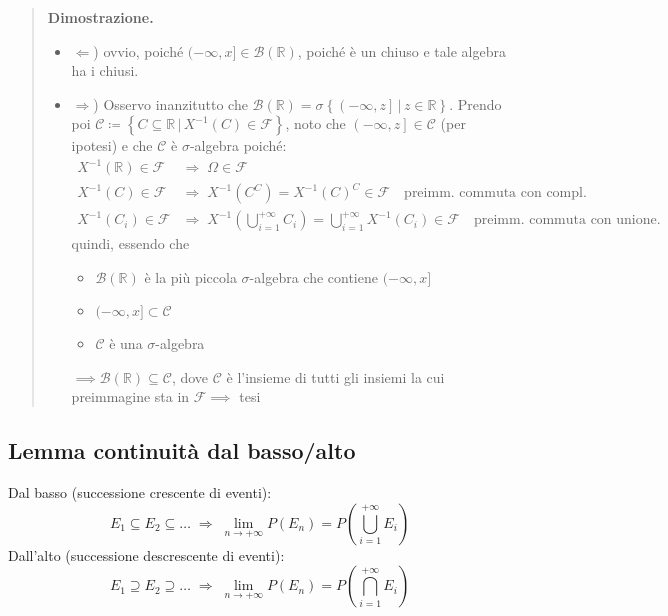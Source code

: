 \documentclass[a4paper,10pt]{article}
\newcommand{\re}{\mathbb{R}} %
\theoremstyle{remark}
\theoremstyle{definition}
\newenvironment{dimo}{\begin{quote}\textbf{Dimostrazione.}}{\end{quote}} %
\begin{document}
\begin{dimo}
\begin{itemize}
\item $\Leftarrow$) ovvio, poiché $(-\infty,x]\in\mathcal{B}(\re)$, poiché è un chiuso e tale algebra ha i chiusi.
\item $\Rightarrow$) Osservo inanzitutto che $\mathcal{B}\left(\mathbb{R}\right)=\sigma\left\{ \left(-\infty,z\right]\,|\,z\in\mathbb{R}\right\} $.
Prendo poi $\mathcal{C}\coloneqq\left\{ C\subseteq\mathbb{R}\,|\,X^{-1}\left(C\right)\in\mathcal{F}\right\} $,
noto che $\left(-\infty,z\right]\in\mathcal{C}$ (per ipotesi) e che $\mathcal{C}$
è $\sigma$-algebra poiché:
\[
\begin{array}{ll}
X^{-1}\left(\mathbb{R}\right)\in\mathcal{F} & \Longrightarrow\;\Omega\in\mathcal{F}\\
X^{-1}\left(C\right)\in\mathcal{F} & \Longrightarrow\;X^{-1}\left(C^{C}\right)=X^{-1}\left(C\right)^{C}\in\mathcal{F} \quad \text{preimm. commuta con compl.}\\
X^{-1}\left(C_{i}\right)\in\mathcal{F} & \Longrightarrow\;X^{-1}\left(\bigcup_{i=1}^{+\infty}C_{i}\right)=\bigcup_{i=1}^{+\infty}X^{-1}\left(C_{i}\right)\in\mathcal{F}  \quad \text{preimm. commuta con unione.}
\end{array}
\]
quindi, essendo che 
\begin{itemize}
    \item $\mathcal{B}(\re)$ è la più piccola $\sigma$-algebra che contiene $(-\infty,x]$ 
    \item $(-\infty,x] \subset \mathcal{C}$
    \item $\mathcal{C}$ è una $\sigma$-algebra
\end{itemize}
$\implies \mathcal{B}\left(\mathbb{R}\right)\subseteq\mathcal{C}$, dove $\mathcal{C}$ è l'insieme di tutti gli insiemi la cui preimmagine sta in $\mathcal{F} \implies$ tesi
\end{itemize}
\end{dimo}



\subsection*{Lemma continuità dal basso/alto}
Dal basso (successione crescente di eventi):
$$E_{1}\subseteq E_{2}\subseteq\dots\;\Longrightarrow\;\lim_{n\rightarrow+\infty}P\left(E_{n}\right)=P\left(\bigcup_{i=1}^{+\infty}E_{i}\right)$$
Dall'alto (successione descrescente di eventi):
$$E_{1}\supseteq E_{2}\supseteq\dots\;\Longrightarrow\;\lim_{n\rightarrow+\infty}P\left(E_{n}\right)=P\left(\bigcap_{i=1}^{+\infty}E_{i}\right)$$
\end{document}
